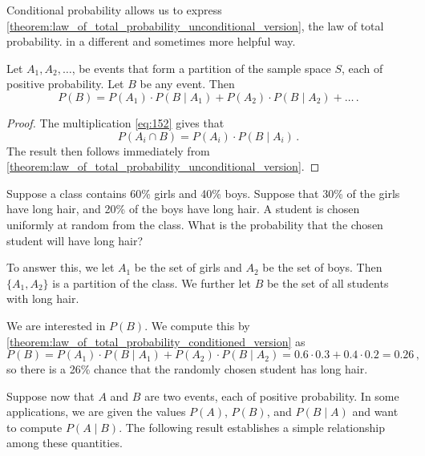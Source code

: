 Conditional probability allows us to express \autoref{theorem:law_of_total_probability_unconditional_version}, the law of total probability. in a different and sometimes more helpful way.
\begin{theorem}
    \label{theorem:law_of_total_probability_conditioned_version}
    Let $A_1, A_2,\ldots$, be events that form a partition of the sample space $S$, each of positive probability. Let $B$ be any event. Then
    $$
        P(B)=P(A_1)\cdot P(B\mid A_1)+P(A_2)\cdot P(B\mid A_2)+\ldots\,.
    $$
\end{theorem}
\begin{proof}
    The multiplication \autoref{eq:152} gives that $$P(A_i\cap B) = P(A_i)\cdot P(B\mid A_i)\,.$$ The result then follows immediately from \autoref{theorem:law_of_total_probability_unconditional_version}.
\end{proof}

\begin{example}
    Suppose a class contains 60\% girls and 40\% boys. Suppose that 30\% of the girls have long hair, and 20\% of the boys have long hair. A student is chosen uniformly at random from the class. What is the probability that the chosen student will have long hair?

    To answer this, we let $A_1$ be the set of girls and $A_2$ be the set of boys. Then $\{A_1, A_2\}$ is a partition of the class. We further let $B$ be the set of all students with long hair.

    We are interested in $P(B)$. We compute this by \autoref{theorem:law_of_total_probability_conditioned_version} as
    $$
        P(B)=P(A_1)\cdot P(B\mid A_1) + P(A_2)\cdot P(B\mid A_2) = 0.6 \cdot 0.3 + 0.4 \cdot 0.2 = 0.26\,,
    $$
    so there is a 26\% chance that the randomly chosen student has long hair.
\end{example}

Suppose now that $A$ and $B$ are two events, each of positive probability. In some applications, we are given the values $P(A)$, $P(B)$, and $P(B\mid A)$ and want to compute $P(A\mid B)$. The following result establishes a simple relationship among these quantities.

